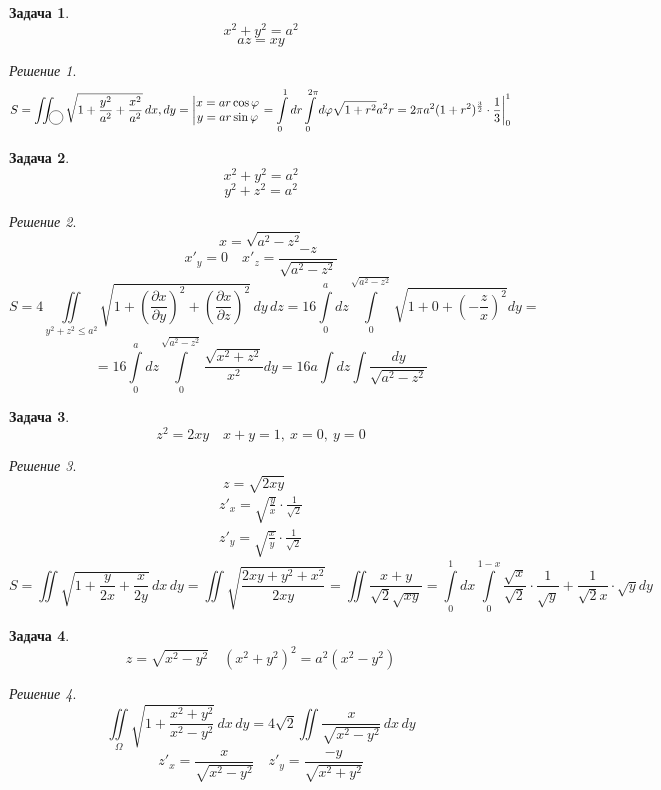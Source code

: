\documentclass[english]{article}
\theoremstyle{plain}
\theoremstyle{remark}
\newtheorem*{solution}{Решение}
\theoremstyle{definition}
\newtheorem{task}{Задача}
\begin{document}
\begin{task}
\[ x^2 + y^2 = a^2 \]
\[ az = xy \]
\end{task}
\begin{solution}
\[ S = \iint_{\begin{tikzpicture}
\draw (0, 0) circle[radius=0.2cm];
\end{tikzpicture}} \sqrt{1 + \frac{y^2}{a^2} + \frac{x^2}{a^2}}\,dx,dy = \left|\begin{matrix} x = a r \cos\varphi \\ y = a r \sin \varphi \end{matrix}\right. = \int\limits^1_0 dr \int\limits^{2\pi}_0 d\varphi \sqrt{1 + r^2}a^2 r = 2\pi a^2 (1 + r^2)^\frac{3}{2} \cdot \frac{1}{3} \bigg|^1_0 \]
\end{solution}
\begin{task}
\[ x^2 + y^2 = a^2 \]
\[ y^2 + z^2 = a^2 \]
\end{task}
\begin{solution}
\[ x = \sqrt{a^2 - z^2} \]
\[ x'_y = 0\quad x'_z = \frac{-z}{\sqrt{a^2 - z^2}} \]
\[ S = 4 \iint\limits_{y^2 + z^2 \le a^2} \sqrt{1 + \left(\frac{\partial x}{\partial y}\right)^2 + \left(\frac{\partial x}{\partial z}\right)^2}\, dy\, dz = 16 \int\limits_0^a dz \int\limits^{\sqrt{a^2 - z^2}}_0 \sqrt{1 + 0 + \left(-\frac{z}{x}\right)^2} dy = \]
\[ = 16 \int\limits^a_0 dz \int\limits^{\sqrt{a^2 - z^2}}_0 \frac{\sqrt{x^2 + z^2}}{x^2} dy = 16 a \int dz \int \frac{dy}{\sqrt{a^2 - z^2}} \]
\end{solution}

\begin{task}
\[ z^2 = 2xy\quad x + y = 1,\ x= 0,\ y = 0\]
\end{task}
\begin{solution}
\[ z = \sqrt{2xy}\quad \]
\[ \begin{matrix}
z'_x = \sqrt{\frac{y}{x}}\cdot \frac{1}{\sqrt{2}} \\
z'_y = \sqrt{\frac{x}{y}}\cdot \frac{1}{\sqrt{2}} \end{matrix }\]
\[ S = \iint \sqrt{1 + \frac{y}{2x} + \frac{x}{2y}}\,dx\,dy = \iint \sqrt{\frac{2xy + y^2 + x^2}{2xy}} = \iint \frac{x + y}{\sqrt{2}\sqrt{xy}} = \int\limits^1_0 dx \int\limits_0^{1 - x} \frac{\sqrt{x}}{\sqrt{2}}\cdot\frac{1}{\sqrt{y}} + \frac{1}{\sqrt{2}x}\cdot \sqrt{y} dy\]
\end{solution}

\begin{task}
\[ z = \sqrt{x^2 - y^2}\quad (x^2 + y^2)^2 = a^2(x^2 - y^2) \]
\end{task}
\begin{solution}
\[ \iint\limits_\Omega \sqrt{1 + \frac{x^2 + y^2}{x^2 - y^2}}\,dx\,dy = 4\sqrt{2} \iint \frac{x}{\sqrt{x^2 - y^2}}\,dx\,dy \]
\[ z'_x = \frac{x}{\sqrt{x^2 - y^2}}\quad z'_y = \frac{-y}{\sqrt{x^2 + y^2}} \]
\end{solution}
\end{document}
